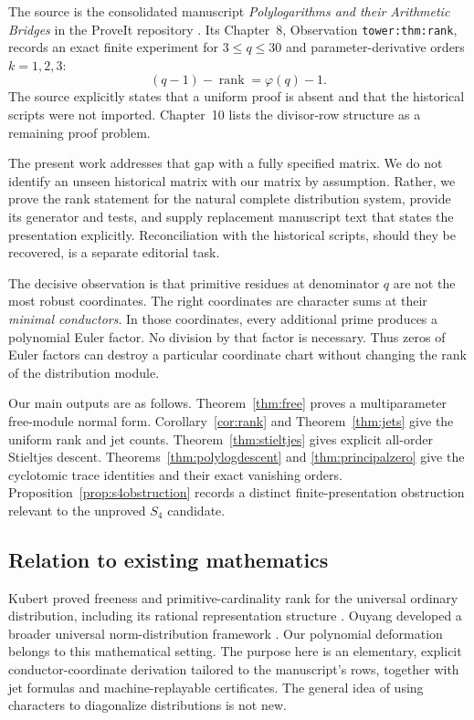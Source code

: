 \documentclass[11pt]{article}
\numberwithin{equation}{section}
\theoremstyle{definition}\newtheorem{definition}[theorem]{Definition}
\theoremstyle{remark}\newtheorem{remark}[theorem]{Remark}
\DeclareMathOperator{\rank}{rank}
\newcommand{\code}[1]{\texttt{\small #1}}
\begin{document}
The source is the consolidated manuscript \emph{Polylogarithms and their
Arithmetic Bridges} in the ProveIt repository \cite{repo}. Its Chapter~8,
Observation \code{tower:thm:rank}, records an exact finite experiment for
$3\le q\le30$ and parameter-derivative orders $k=1,2,3$:
\begin{equation}\label{eq:target}
(q-1)-\rank=\varphi(q)-1.
\end{equation}
The source explicitly states that a uniform proof is absent and that the
historical scripts were not imported. Chapter~10 lists the divisor-row
structure as a remaining proof problem.

The present work addresses that gap with a fully specified matrix. We do not
identify an unseen historical matrix with our matrix by assumption. Rather,
we prove the rank statement for the natural complete distribution system,
provide its generator and tests, and supply replacement manuscript text that
states the presentation explicitly. Reconciliation with the historical
scripts, should they be recovered, is a separate editorial task.

The decisive observation is that primitive residues at denominator $q$ are
not the most robust coordinates. The right coordinates are character sums
at their \emph{minimal conductors}. In those coordinates, every additional
prime produces a polynomial Euler factor. No division by that factor is
necessary. Thus zeros of Euler factors can destroy a particular coordinate
chart without changing the rank of the distribution module.

Our main outputs are as follows. Theorem~\ref{thm:free} proves a multiparameter
free-module normal form. Corollary~\ref{cor:rank} and
Theorem~\ref{thm:jets} give the uniform rank and jet counts.
Theorem~\ref{thm:stieltjes} gives explicit all-order Stieltjes descent.
Theorems~\ref{thm:polylogdescent} and \ref{thm:principalzero} give the
cyclotomic trace identities and their exact vanishing orders.
Proposition~\ref{prop:s4obstruction} records a distinct finite-presentation
obstruction relevant to the unproved $S_4$ candidate.

\subsection{Relation to existing mathematics}

Kubert proved freeness and primitive-cardinality rank for the universal
ordinary distribution, including its rational representation structure
\cite{kubert}. Ouyang developed a broader universal norm-distribution
framework \cite{ouyang}. Our polynomial deformation belongs to this
mathematical setting. The purpose here is an elementary, explicit
conductor-coordinate derivation tailored to the manuscript's rows, together
with jet formulas and machine-replayable certificates. The general idea of
using characters to diagonalize distributions is not new.
\end{document}
